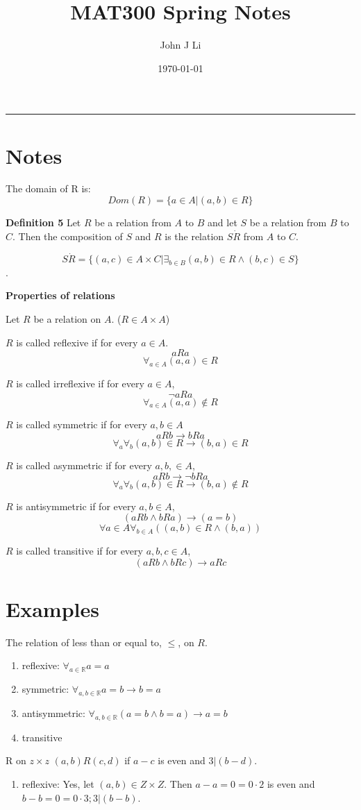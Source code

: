 \documentclass{article}
\title{MAT300 Spring Notes}
\date{\today}
\author{John J Li}
\begin{document}
    \maketitle
    \thispagestyle{empty}
    \noindent\rule{\textwidth}{0.8pt}

    \section*{Notes}

    The domain of R is:
    \[Dom(R)=\{a\in A|(a,b) \in R\}\]

    \textbf{Definition 5} Let $R$ be a relation from $A$ to $B$ and let $S$ be a relation from
    $B$ to $C$. Then the composition of $S$ and $R$ is the relation $S\dot R$ from $A$ to $C$.

    \[S\dot R=\{(a,c)\in A\times C|\exists_{b\in B}(a,b)\in R \land (b,c)\in S\}\].

    \textbf{Properties of relations}

    Let $R$ be a relation on $A$. ($R\in A\times A$)

    $R$ is called reflexive if for every $a\in A$. 
    \[aRa\]
    \[\forall_{a\in A} (a,a)\in R\]

    $R$ is called irreflexive if for every $a\in A$, 
    \[\neg aRa\]
    \[\forall_{a\in A} (a,a)\notin R\]

    $R$ is called symmetric if for every $a,b\in A$
    \[aRb\rightarrow bRa\]
    \[\forall_a\forall_b(a,b)\in R\rightarrow (b,a)\in R\]

    $R$ is called asymmetric if for every $a,b,\in A$,
    \[aRb\rightarrow\neg bRa\]
    \[\forall_a\forall_b(a,b)\in R\rightarrow (b,a)\notin R\]
    
    $R$ is antisymmetric if for every $a,b\in A$,
    \[(aRb\land bRa)\rightarrow(a=b)\] 
    \[\forall{a\in A}\forall_{b\in A}((a,b)\in R\land (b,a))\]

    $R$ is called transitive if for every $a,b,c\in A$,
    \[(aRb\land bRc)\rightarrow aRc\]



    \section*{Examples}

    The relation of less than or equal to, $\leq$, on $R$.

    \begin{enumerate}
        \item reflexive: $\forall_{a\in\mathbb{R}} a=a$
        \item symmetric: $\forall_{a,b\in\mathbb{R}} a=b\rightarrow b=a$
        \item antisymmetric: $\forall_{a,b\in\mathbb{R}} (a=b\land b=a)\rightarrow a=b$
        \item transitive
    \end{enumerate}

    R on $z\times z$ $(a,b)R(c,d)$ if $a-c$ is even and $3|(b-d)$.
    
    \begin{enumerate}
        \item reflexive: Yes, let $(a,b) \in Z\times Z$. Then $a-a=0=0\cdot 2$ is even
        and $b-b=0=0\cdot 3; 3|(b-b)$.
    \end{enumerate}
    
\end{document}
